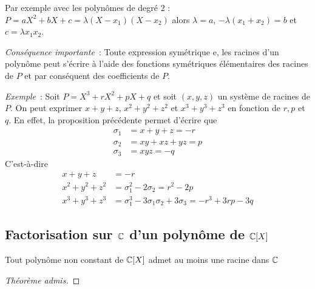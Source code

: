 Par exemple avec les polynômes de degré $2$ : $P=aX^2+bX+c=\lambda(X-x_1)(X-x_2)$ alors $\lambda=a$, $-\lambda(x_1+x_2)=b$ et $c=\lambda x_1x_2$.

\emph{Conséquence importante}~: Toute expression symétrique e, les racines d'un polynôme peut s'écrire à l'aide des fonctions symétriques élémentaires des racines de $P$ et par conséquent des coefficients de $P$.

\emph{Exemple}~: Soit $P=X^3+rX^2+pX +q$ et soit $(x,y,z)$ un système de racines de $P$. On peut exprimer $x+y+z$, $x^2+y^2+z^2$ et $x^3+y^3+z^3$ en fonction de $r, p$ et $q$. En effet, la proposition précédente permet d'écrire que
\begin{align}
  \sigma_1 &=x+y+z =-r\\
  \sigma_2 &=xy+xz+yz =p\\
  \sigma_3 &=xyz =-q
\end{align}
C'est-à-dire
\begin{align}
  x+y+z &=-r \\
  x^2+y^2+z^2 &= \sigma_1^2 - 2\sigma_2 = r^2-2p\\
  x^3+y^3+z^3 &=\sigma_1^3 -3\sigma_1\sigma_2 + 3 \sigma_3 = -r^3+3rp-3q
\end{align}

\subsection{Factorisation sur $\mathbb{C}$ d'un polynôme de $\mathbb{C}[X]$}

\begin{theo}
  Tout polynôme non constant de $\mathbb{C}[X]$ admet au moins une racine dans $\mathbb{C}$
\end{theo}
\begin{proof}[Théorème admis]
\end{proof}

